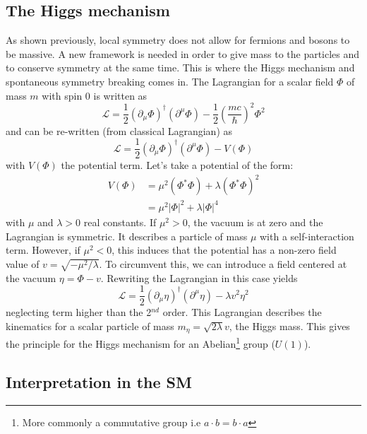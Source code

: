 \subsection{The Higgs mechanism}
\label{subsec:HiggsMecha}

As shown previously, local symmetry does not allow for fermions and bosons to be massive. A new framework is needed in order to give mass to the particles and to conserve symmetry at the same time. This is where the Higgs mechanism and spontaneous symmetry breaking comes in. The Lagrangian for a scalar field $\Phi$ of mass $m$ with spin 0 is written as \cite{Griffiths:343277}
\begin{equation}
  \mathcal{L} = \frac{1}{2}(\partial_{\mu}\Phi)^{\dagger}(\partial^{\mu}\Phi) - \frac{1}{2}\left(\frac{mc}{\hbar}\right)^2\Phi^2
\end{equation}
and can be re-written (from classical Lagrangian) as
\begin{equation} \label{eq:HiggsLag}
  \mathcal{L} = \frac{1}{2}(\partial_{\mu}\Phi)^{\dagger}(\partial^{\mu}\Phi) - V(\Phi)
\end{equation}
with $V(\Phi)$ the potential term. Let's take a potential of the form:
\begin{equation}
  \begin{aligned}
    V(\Phi) & = \mu^2(\Phi^*\Phi) + \lambda(\Phi^*\Phi)^2 \\
    & = \mu^2|\Phi|^2 + \lambda|\Phi|^4
  \end{aligned}
\end{equation}
with $\mu$ and $\lambda > 0$ real constants. If $\mu^2 > 0$, the vacuum is at zero and the Lagrangian is symmetric. It describes a particle of mass $\mu$ with a self-interaction term. However, if $\mu^2 < 0$, this induces that the potential has a non-zero field value of $v = \sqrt{-\mu^2/\lambda}$. To circumvent this, we can introduce a field centered at the vacuum $\eta = \Phi - v$. Rewriting the Lagrangian in this case yields
\begin{equation}
  \mathcal{L} = \frac{1}{2}(\partial_{\mu}\eta)^{\dagger}(\partial^{\mu}\eta) - \lambda v^2\eta^2
\end{equation}
neglecting term higher than the 2$^{nd}$ order. This Lagrangian describes the kinematics for a scalar particle of mass $m_{\eta} = \sqrt{2\lambda}v$, the Higgs mass. This gives the principle for the Higgs mechanism for an Abelian\footnote{More commonly a commutative group i.e $a \cdot b = b \cdot a$} group ($U(1)$).

\subsection{Interpretation in the SM}

